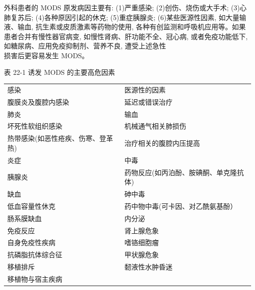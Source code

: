 \documentclass[10pt]{article}
\begin{document}
外科患者的 MODS 原发病因主要有: (1)严重感染; (2)创伤、烧伤或大手术; (3)心肺复苏后; (4)各种原因引起的休克; (5)重症胰腺炎; (6)某些医源性因素, 如大量输液、输血, 抗生素或皮质激素等药物的使用, 各种有创监测和呼吸机应用等。如果患者合并有慢性器官病变, 如慢性肾病、肝功能不全、冠心病, 或者免疫功能低下, 如糖尿病、应用免疫抑制剂、营养不良, 遭受上述急性\\
损害后更容易发生 MODS。

表 22-1 诱发 MODS 的主要高危因素

\begin{center}
\begin{tabular}{l||l}
\hline
感染 & 医源性的因素 \\
腹膜炎及腹腔内感染 & 延迟或错误治疗 \\
肺炎 & 输血 \\
坏死性软组织感染 & 机械通气相关肺损伤 \\
热带感染(如恶性疮疾、伤寒、登革热) & 治疗相关的腹腔内压提高 \\
炎症 & 中毒 \\
胰腺炎 & 药物反应(如丙泊酚、胺碘酮、单克隆抗体) \\
缺血 & 砷中毒 \\
低血容量性休克 & 药中物中毒(可卡因、对乙酰氨基酚） \\
肠系膜缺血 & 内分泌 \\
免疫反应 & 肾上腺危象 \\
自身免疫性疾病 & 嗜铬细胞瘤 \\
抗磷脂抗体综合征 & 甲状腺危象 \\
移植排斥 & 䵑液性水肿昏迷 \\
移植物与宿主疾病 &  \\
\hline
\end{tabular}
\end{center}
\end{document}
